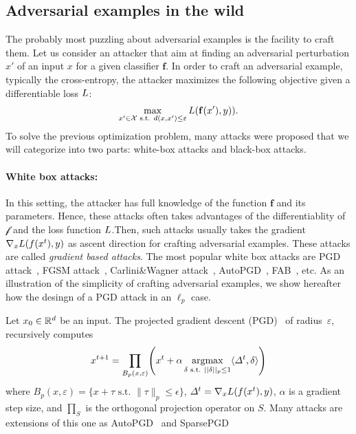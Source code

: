 \subsection{Adversarial examples in the wild}

The probably most puzzling about adversarial examples is the facility to craft them. Let us consider an attacker that aim at finding an adversarial perturbation $x'$ of an input $x$ for a given classifier $\mathbf{f}$.  In order to craft an adversarial example, typically the cross-entropy, the attacker maximizes the following objective given a differentiable loss $L$:
\begin{align}
    \max_{x'\in\XX\text{ s.t. } d(x,x')\leq \varepsilon}\loss\left(\mathbf{f}(x'), y)\right).
\end{align}
To solve the previous optimization problem, many attacks were proposed that we will categorize into two parts: white-box attacks and black-box attacks.
\paragraph{White box attacks:} In this setting, the attacker has  full knowledge of the function $\mathbf{f}$ and its parameters. Hence, these attacks often takes advantages of the differentiablity of $\mathcal{f}$ and the loss function $L$.Then, such attacks usually takes the gradient $\nabla_x \loss\left(f\left(x^t\right),y\right)$ as ascent direction for crafting adversarial examples.  These attacks are called \emph{gradient based attacks}. The most popular white box attacks are PGD attack~\cite{kurakin2016adversarial,madry2017towards}, FGSM attack~\citep{goodfellow2014explaining}, Carlini\&Wagner attack~\citep{carlini2017towards}, AutoPGD~\citep{Croce2020MinimallyDA}, FAB~\citep{Croce2020MinimallyDA}, etc. As an illustration of the simplicity of crafting adversarial examples, we show hereafter how the desingn of a PGD attack in an $\ell_p$ case.
\begin{example*} Let $x_0\in\mathbb{R}^d$ be an input. The projected gradient descent (PGD)~\cite{kurakin2016adversarial,madry2017towards} of radius~$\varepsilon$, recursively computes
\begin{align*}
x^{t+1}=\prod_{B_p(x,\varepsilon)}\left(x^t
+\alpha \argmaxB_{\delta\text{ s.t. }||\delta||_p\leq1} \langle\Delta^t,\delta \rangle\right)
\end{align*}
where $B_p(x,\varepsilon) = \{ x+\tau \text{~s.t.~} \lVert\tau\rVert_p \leq \epsilon\}$, $\Delta^t=\nabla_x \loss\left(f\left(x^t\right),y\right)$, $\alpha$ is a gradient step size, and $\prod_S$ is the orthogonal projection operator on $S$. Many attacks are extensions of this one as AutoPGD~\citep{Croce2020ReliableEO} and SparsePGD~\citep{tramer2019adversarial}
\end{example*}
